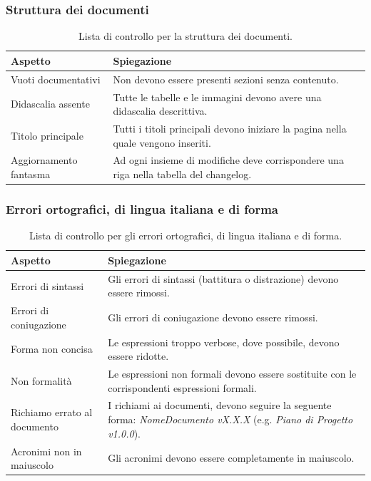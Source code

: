 \documentclass[8pt]{article}
\begin{document}
\subsubsection{Struttura dei documenti}
\renewcommand{\arraystretch}{2.5}
\begin{longtable}{|>{\centering}p{5cm}|>{\centering\arraybackslash}p{10cm}|}
\hline
\rowcolor{white}
    \textbf{Aspetto} & \textbf{Spiegazione} \\
\hline
\endfirsthead
\rowcolor{white}
\caption{Lista di controllo per la struttura dei documenti.}
\label{table:Lista di controllo per la struttura dei documenti}
\endlastfoot
    Vuoti documentativi & Non devono essere presenti sezioni senza contenuto. \\
\hline
    Didascalia assente & Tutte le tabelle e le immagini devono avere una didascalia descrittiva. \\
\hline    
Titolo principale & Tutti i titoli principali devono iniziare la pagina nella quale vengono
    inseriti. \\
\hline
    Aggiornamento fantasma & Ad ogni insieme di modifiche deve corrispondere una riga nella tabella
    del changelog. \\


    \hline
\end{longtable}
\subsubsection{Errori ortografici, di lingua italiana e di forma}
\renewcommand{\arraystretch}{2.5}
\begin{longtable}{|>{\centering}p{5cm}|>{\centering\arraybackslash}p{10cm}|}
\hline
\rowcolor{white}
    \textbf{Aspetto} & \textbf{Spiegazione} \\
\hline
\endfirsthead
\rowcolor{white}
\caption{Lista di controllo per gli errori ortografici, di lingua italiana e di forma.}
\label{table:Lista di controllo per gli errori ortografici, di lingua italiana e di forma}
\endlastfoot
    Errori di sintassi & Gli errori di sintassi (battitura o distrazione) devono essere rimossi.\\
\hline
    Errori di coniugazione & Gli errori di coniugazione devono essere rimossi. \\
\hline
    Forma non concisa & Le espressioni troppo verbose, dove possibile, devono essere ridotte.\\
\hline
    Non formalità & Le espressioni non formali devono essere sostituite con le corrispondenti
    espressioni formali. \\
\hline
    Richiamo errato al documento & I richiami ai documenti, devono seguire la seguente forma:
    \textit{NomeDocumento vX.X.X} (e.g. \textit{Piano di Progetto v1.0.0}).\\
\hline
    Acronimi non in maiuscolo & Gli acronimi devono essere completamente in maiuscolo. \\
\hline
\end{longtable}
\end{document}
